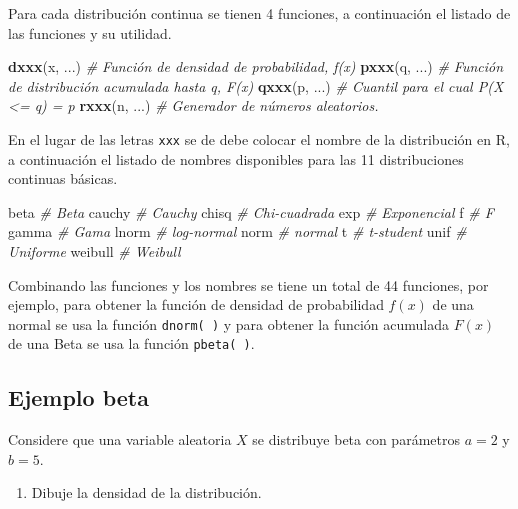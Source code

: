 \documentclass[10pt,]{krantz}
\makeatletter
\newenvironment{Shaded}{\begin{snugshade}}{\end{snugshade}}
\newcommand{\KeywordTok}[1]{\textcolor[rgb]{0.13,0.29,0.53}{\textbf{#1}}}
\newcommand{\CommentTok}[1]{\textcolor[rgb]{0.56,0.35,0.01}{\textit{#1}}}
\newcommand{\NormalTok}[1]{#1}
\providecommand{\tightlist}{%
  \setlength{\itemsep}{0pt}\setlength{\parskip}{0pt}}
\let\proglang=\textsf
\newenvironment{kframe}{%
\medskip{}
\setlength{\fboxsep}{.8em}
 \def\at@end@of@kframe{}%
 \ifinner\ifhmode%
  \def\at@end@of@kframe{\end{minipage}}%
  \begin{minipage}{\columnwidth}%
 \fi\fi%
 \def\FrameCommand##1{\hskip\@totalleftmargin \hskip-\fboxsep
 \colorbox{shadecolor}{##1}\hskip-\fboxsep
     \hskip-\linewidth \hskip-\@totalleftmargin \hskip\columnwidth}%
 \MakeFramed {\advance\hsize-\width
   \@totalleftmargin\z@ \linewidth\hsize
   \@setminipage}}%
 {\par\unskip\endMakeFramed%
 \at@end@of@kframe}
\renewenvironment{Shaded}{\begin{kframe}}{\end{kframe}}
\makeatother
\begin{document}
Para cada distribución continua se tienen 4 funciones, a continuación el
listado de las funciones y su utilidad.

\begin{Shaded}
\begin{Highlighting}[]
\KeywordTok{dxxx}\NormalTok{(x, ...)  }\CommentTok{# Función de densidad de probabilidad, f(x)}
\KeywordTok{pxxx}\NormalTok{(q, ...)  }\CommentTok{# Función de distribución acumulada hasta q, F(x)}
\KeywordTok{qxxx}\NormalTok{(p, ...)  }\CommentTok{# Cuantil para el cual P(X <= q) = p}
\KeywordTok{rxxx}\NormalTok{(n, ...)  }\CommentTok{# Generador de números aleatorios.}
\end{Highlighting}
\end{Shaded}

En el lugar de las letras \texttt{xxx} se de debe colocar el nombre de
la distribución en \proglang{R}, a continuación el listado de nombres
disponibles para las 11 distribuciones continuas básicas.

\begin{Shaded}
\begin{Highlighting}[]
\NormalTok{beta     }\CommentTok{# Beta}
\NormalTok{cauchy   }\CommentTok{# Cauchy}
\NormalTok{chisq    }\CommentTok{# Chi-cuadrada}
\NormalTok{exp      }\CommentTok{# Exponencial}
\NormalTok{f        }\CommentTok{# F}
\NormalTok{gamma    }\CommentTok{# Gama}
\NormalTok{lnorm    }\CommentTok{# log-normal}
\NormalTok{norm     }\CommentTok{# normal}
\NormalTok{t        }\CommentTok{# t-student}
\NormalTok{unif     }\CommentTok{# Uniforme}
\NormalTok{weibull  }\CommentTok{# Weibull}
\end{Highlighting}
\end{Shaded}

Combinando las funciones y los nombres se tiene un total de 44
funciones, por ejemplo, para obtener la función de densidad de
probabilidad \(f(x)\) de una normal se usa la función \texttt{dnorm(\ )}
y para obtener la función acumulada \(F(x)\) de una Beta se usa la
función \texttt{pbeta(\ )}.

\subsection*{Ejemplo beta}\label{ejemplo-beta}


Considere que una variable aleatoria \(X\) se distribuye beta con
parámetros \(a=2\) y \(b=5\).

\begin{enumerate}
\def\labelenumi{\arabic{enumi})}
\tightlist
\item
  Dibuje la densidad de la distribución.
\end{enumerate}
\end{document}
